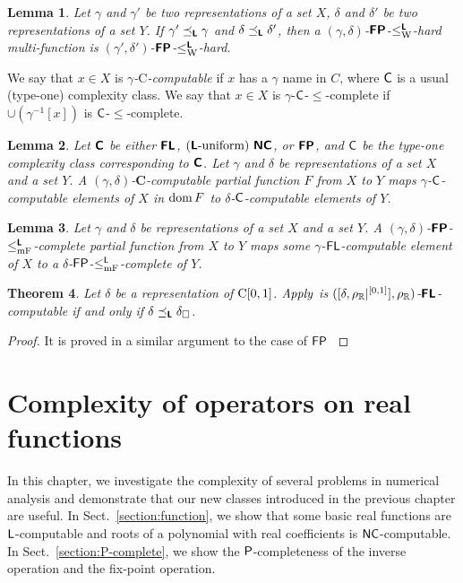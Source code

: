 \documentclass{article}
\newtheorem{theorem}{Theorem}[section]
\newtheorem{lemma}[theorem]{Lemma}
\theoremstyle{definition}
\theoremstyle{remark}
\begin{document}
\begin{lemma}
 Let $\gamma$ and $\gamma'$ be two representations of a set $X$, 
 $\delta$ and $\delta'$ be two representations of a set $Y$.
 If $\gamma' \preceq_{\text{\bfseries \sffamily \upshape L}} \gamma$ and $\delta \preceq_{\text{\bfseries \sffamily \upshape L}} \delta'$,
 then a $(\gamma, \delta)$-$\text{\bfseries \sffamily \upshape FP}$-$\leq _{\mathrm W} ^{\text{\bfseries \sffamily \upshape L}}$-hard multi-function is
 $(\gamma', \delta')$-$\text{\bfseries \sffamily \upshape FP}$-$\leq _{\mathrm W} ^{\text{\bfseries \sffamily \upshape L}}$-hard.
\end{lemma}

We say that $x \in X$ is \emph{$\gamma$-$\mathrm C$-computable} if
$x$ has a $\gamma$ name in $C$,
where $\mathsf{C}$ is a usual (type-one) complexity class.
We say that $x \in X$ is $\gamma$-$\mathsf{C}$-$\le$-complete if
$\cup(\gamma^{-1}[x])$ is $\mathsf{C}$-$\le$-complete.

\begin{lemma}
 Let $\text{\bfseries \sffamily \upshape C}$ be either $\text{\bfseries \sffamily \upshape FL}$, $(\text{\bfseries \sffamily \upshape L}\text{-uniform})\ \text{\bfseries \sffamily \upshape NC}$, 
 or $\text{\bfseries \sffamily \upshape FP}$, and $\mathsf{C}$ be the type-one complexity class
 corresponding to $\text{\bfseries \sffamily \upshape C}$.
 Let $\gamma$ and $\delta$ be representations of a set $X$ and a set $Y$.
 A $(\gamma, \delta)$-$\mathbf C$-computable partial function $F$ from $X$
 to $Y$ maps $\gamma$-$\mathsf{C}$-computable elements of $X$
 in $\mathop{\rm dom} F$ to $\delta$-$\mathsf{C}$-computable elements of $Y$.
\end{lemma}

\begin{lemma}
 \label{lemma:p-comp-maps-l-to-p-comp}
 Let $\gamma$ and $\delta$ be representations of a set $X$ and a set $Y$.
 A $(\gamma, \delta)$-$\text{\bfseries \sffamily \upshape FP}$-$\leq _{\mathrm{mF}} ^{\text{\bfseries \sffamily \upshape L}}$-complete partial function 
 from $X$ to $Y$ maps some $\gamma$-$\mathsf{FL}$-computable element of $X$
 to a $\delta$-$\mathsf{FP}$-$\leq _{\mathrm{mF}}^{\mathsf{L}}$-complete of $Y$.
\end{lemma}



\begin{theorem}
 Let $\delta$ be a representation of $\mathrm C[0, 1]$.
 $\mathit{Apply}$ is $([\delta, \rho _\mathbb R|^{[0,1]}], \rho _\mathbb R)$-$\text{\bfseries \sffamily \upshape FL}$-computable if
 and only if $\delta \preceq_{\text{\bfseries \sffamily \upshape L}} \delta _\square$.
\end{theorem}

\begin{proof}
 It is proved in a similar argument to the case of $\mathsf{FP}$ \cite{kawamura11:_funct_space_repres_and_polyn_time_comput}
\end{proof}





\section{Complexity of operators on real functions}
\label{chapter:applications}
In this chapter, we investigate the complexity of several problems in numerical
analysis and demonstrate that our new classes introduced in the previous
chapter are useful.
In Sect.~\ref{section:function}, 
we show that some basic real functions are $\mathsf{L}$-computable and
roots of a polynomial with real coefficients is $\mathsf{NC}$-computable.
In Sect.~\ref{section:P-complete}, we show the $\mathsf{P}$-completeness of 
the inverse operation and the fix-point operation.
\end{document}

